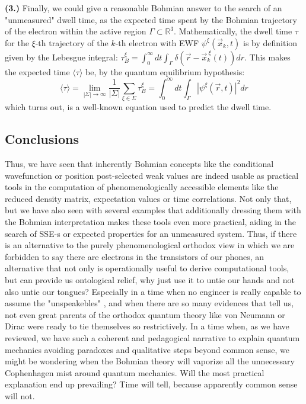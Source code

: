\documentclass[11pt, a4paper]{article} %
\newcommand{\R}{\mathbb{R}} %
\begin{document}
{\bf (3.) }Finally, we could give a reasonable Bohmian answer to the search of an "unmeasured" dwell time, as the expected time spent by the Bohmian trajectory of the electron within the active region $\Gamma\subset \R^3$. Mathematically, the dwell time $\tau$ for the $\xi$-th trajectory of the $k$-th electron with EWF $\psi^\xi(\vec{x}_k,t)$ is by definition given by the Lebesgue integral: $\tau^\xi_B= \int_{0}^\infty  dt \int_\Gamma \delta(\vec{r}-\vec{x}_k^{\:\xi}(t)) dr$. This makes the expected time $\langle \tau\rangle$ be, by the quantum equilibrium hypothesis:
\begin{equation}
\langle \tau \rangle = \lim_{|\Sigma|\rightarrow \infty}\frac{1}{|\Sigma|} \sum_{\xi\in\Sigma} \tau_B^\xi = \int_{0}^\infty dt \int_\Gamma |\psi^\xi(\vec{r},t)|^2dr
\end{equation}
which turns out, is a well-known equation used to predict the dwell time.

\subsection*{Conclusions}\vspace{-0.2cm}
Thus, we have seen that inherently Bohmian concepts like the conditional wavefunction or position post-selected weak values are indeed usable as practical tools in the computation of phenomenologically accessible elements like the reduced density matrix, expectation values or time correlations. Not only that, but we have also seen with several examples that additionally  dressing them with the Bohmian interpretation makes these tools even more practical, aiding in the search of SSE-s or expected properties for an unmeasured system. Thus, if there is an alternative to the purely phenomenological orthodox view in which we are forbidden to say there are electrons in the transistors of our phones, an alternative that not only is operationally useful to derive computational tools, but can provide us ontological relief, why just use it to untie our hands and not also untie our tongues? Especially in a time when no engineer is really capable to assume the "unspeakebles" \cite{where}, and when there are so many evidences that tell us, not even great parents of the orthodox quantum theory like von Neumann \cite{NeumannNoCollapse} or Dirac \cite{Dirac} were ready to tie themselves so restrictively. In a time when, as we have reviewed, we have such a coherent and pedagogical narrative to explain quantum mechanics avoiding paradoxes and qualitative steps beyond common sense, we might be wondering when the Bohmian theory will vaporize all the unnecessary Cophenhagen mist around quantum mechanics. Will the most practical explanation end up prevailing? Time will tell, because apparently common sense will not.
\end{document}
